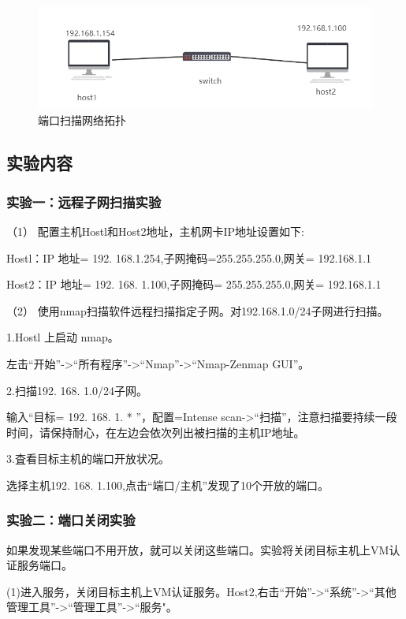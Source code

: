 \documentclass[lang=cn,11pt,a4paper,cite=authoryear]{elegantpaper}
\begin{document}
\begin{figure}[htbp]
	\centering
	\includegraphics[width=0.7\linewidth]{image/screenshot009}
	\caption{端口扫描网络拓扑}
	\label{fig:screenshot009}
\end{figure}

\subsection{实验内容}

\subsubsection{实验一：远程子网扫描实验}

（1）	配置主机Hostl和Host2地址，主机网卡IP地址设置如下: 

Hostl：IP 地址= 192. 168.1.254,子网掩码=255.255.255.0,网关= 192.168.1.1

Host2：IP 地址= 192. 168. 1.100,子网掩码= 255.255.255.0,网关= 192.168.1.1

（2）	使用nmap扫描软件远程扫描指定子网。对192.168.1.0/24子网进行扫描。

1.Hostl 上启动 nmap。

左击“开始”->“所有程序”->“Nmap”->“Nmap-Zenmap GUI”。

2.扫描192. 168. 1.0/24子网。

输入“目标= 192. 168. 1. * ”，配置=Intense scan->“扫描”，注意扫描要持续一段时间，请保持耐心，在左边会依次列出被扫描的主机IP地址。

3.査看目标主机的端口开放状况。

选择主机192. 168. 1.100,点击“端口/主机”发现了10个开放的端口。

\subsubsection{实验二：端口关闭实验}

如果发现某些端口不用开放，就可以关闭这些端口。实验将关闭目标主机上VM认证服务端口。

(1)进入服务，关闭目标主机上VM认证服务。Host2,右击“开始”->“系统”->“其他管理工具”->“管理工具”->“服务"。
\end{document}
